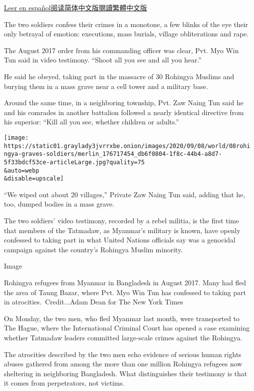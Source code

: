 \href{https://www.nytimes3xbfgragh.onion/es/2020/09/08/espanol/mundo/rohinya-genocidio-birmania.html}{Leer
en
español}\href{https://cn.nytimes3xbfgragh.onion/world/20200909/myanmar-rohingya-genocide/}{阅读简体中文版}\href{https://cn.nytimes3xbfgragh.onion/world/20200909/myanmar-rohingya-genocide/zh-hant/}{閱讀繁體中文版}

The two soldiers confess their crimes in a monotone, a few blinks of the
eye their only betrayal of emotion: executions, mass burials, village
obliterations and rape.

The August 2017 order from his commanding officer was clear, Pvt. Myo
Win Tun said in video testimony. ``Shoot all you see and all you hear.''

He said he obeyed, taking part in the massacre of 30 Rohingya Muslims
and burying them in a mass grave near a cell tower and a military base.

Around the same time, in a neighboring township, Pvt. Zaw Naing Tun said
he and his comrades in another battalion followed a nearly identical
directive from his superior: ``Kill all you see, whether children or
adults.''

\texttt{[image: https://static01.graylady3jvrrxbe.onion/images/2020/09/08/world/08rohingya-graves-soldiers/merlin\_176717454\_db6f0804-1f8c-44b4-a8d7-5f33bdcf53ce-articleLarge.jpg?quality=75\\\&auto=webp\\\&disable=upscale]}

``We wiped out about 20 villages,'' Private Zaw Naing Tun said, adding
that he, too, dumped bodies in a mass grave.

The two soldiers' video testimony, recorded by a rebel militia, is the
first time that members of the Tatmadaw, as Myanmar's military is known,
have openly confessed to taking part in what United Nations officials
say was a genocidal campaign against the country's Rohingya Muslim
minority.

Image

Rohingya refugees from Myanmar in Bangladesh in August 2017. Many had
fled the area of Taung Bazar, where Pvt. Myo Win Tun has confessed to
taking part in atrocities.~Credit...Adam Dean for The New York Times

On Monday, the two men, who fled Myanmar last month, were transported to
The Hague, where the International Criminal Court has opened a case
examining whether Tatmadaw leaders committed large-scale crimes against
the Rohingya.

The atrocities described by the two men echo evidence of serious human
rights abuses gathered from among the more than one million Rohingya
refugees now sheltering in neighboring Bangladesh. What distinguishes
their testimony is that it comes from perpetrators, not victims.

